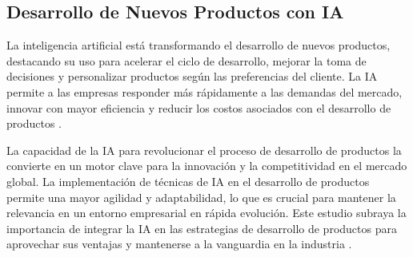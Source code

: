 \subsection{Desarrollo de Nuevos Productos con IA}

La inteligencia artificial está transformando el desarrollo de nuevos productos, destacando su uso para acelerar el ciclo de desarrollo, mejorar la toma de decisiones y personalizar productos según las preferencias del cliente. La IA permite a las empresas responder más rápidamente a las demandas del mercado, innovar con mayor eficiencia y reducir los costos asociados con el desarrollo de productos \cite{Cooper2024}.

La capacidad de la IA para revolucionar el proceso de desarrollo de productos la convierte en un motor clave para la innovación y la competitividad en el mercado global. La implementación de técnicas de IA en el desarrollo de productos permite una mayor agilidad y adaptabilidad, lo que es crucial para mantener la relevancia en un entorno empresarial en rápida evolución. Este estudio subraya la importancia de integrar la IA en las estrategias de desarrollo de productos para aprovechar sus ventajas y mantenerse a la vanguardia en la industria \cite{Cooper2024}.
